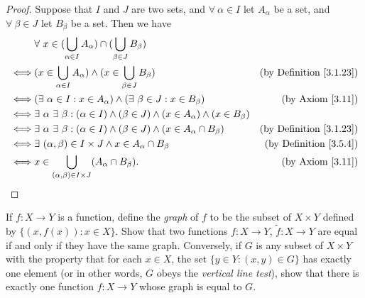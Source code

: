 \begin{proof}
Suppose that \(I\) and \(J\) are two sets, and \(\forall\ \alpha \in I\) let \(A_{\alpha}\) be a set, and \(\forall\ \beta \in J\) let \(B_{\beta}\) be a set.
Then we have
\begin{align*}
& \forall\ x \in (\bigcup_{\alpha \in I} A_{\alpha}) \cap (\bigcup_{\beta \in J} B_{\beta}) \\
\iff & (x \in \bigcup_{\alpha \in I} A_{\alpha}) \land (x \in \bigcup_{\beta \in J} B_{\beta}) & \text{(by Definition \ref{3.1.23})} \\
\iff & (\exists\ \alpha \in I : x \in A_{\alpha}) \land (\exists\ \beta \in J : x \in B_{\beta}) & \text{(by Axiom \ref{3.11})} \\
\iff & \exists\ \alpha \ \exists\ \beta : (\alpha \in I) \land (\beta \in J) \land (x \in A_{\alpha}) \land (x \in B_{\beta}) \\
\iff & \exists\ \alpha \ \exists\ \beta : (\alpha \in I) \land (\beta \in J) \land (x \in A_{\alpha} \cap B_{\beta}) & \text{(by Definition \ref{3.1.23})} \\
\iff & \exists\ (\alpha, \beta) \in I \times J \land x \in A_{\alpha} \cap B_{\beta} & \text{(by Definition \ref{3.5.4})} \\
\iff & x \in \bigcup_{(\alpha, \beta) \in I \times J} (A_{\alpha} \cap B_{\beta}). & \text{(by Axiom \ref{3.11})}
\end{align*}
\end{proof}

\begin{exercise}\label{ex 3.5.10}
If \(f : X \to Y\) is a function, define the \emph{graph} of \(f\) to be the subset of \(X \times Y\) defined by \(\{(x, f(x)) : x \in X\}\).
Show that two functions \(f : X \to Y\), \(\tilde{f} : X \to Y\) are equal if and only if they have the same graph.
Conversely, if \(G\) is any subset of \(X \times Y\) with the property that for each \(x \in X\), the set \(\{y \in Y : (x, y) \in G\}\) has exactly one element (or in other words, \(G\) obeys the \emph{vertical line test}), show that there is exactly one function \(f : X \to Y\) whose graph is equal to \(G\).
\end{exercise}


